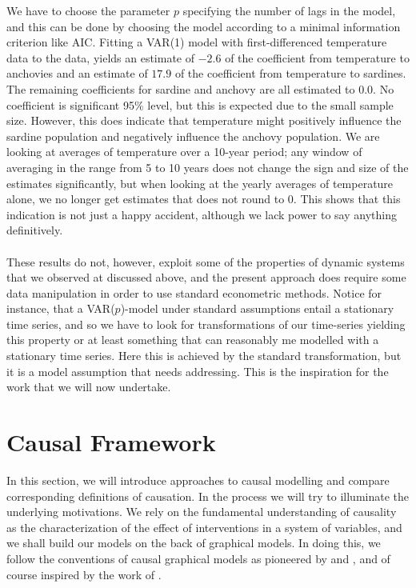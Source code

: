 \documentclass[11pt, a4paper]{memoir}
\theoremstyle{break}
\theoremstyle{break}
\theoremstyle{nonumberplain}
\begin{document}
We have to choose the parameter $p$ specifying the number of lags in the model, and this can be done by choosing the model according to a minimal information criterion like AIC. Fitting a VAR(1) model with first-differenced temperature data to the data, yields an estimate of $-2.6$ of the coefficient from temperature to anchovies and an estimate of $17.9$ of the coefficient from temperature to sardines. The remaining coefficients for sardine and anchovy are all estimated to $0.0$. No coefficient is significant 95\% level, but this is expected due to the small sample size. However, this does indicate that temperature might positively influence the sardine population and negatively influence the anchovy population. We are looking at averages of temperature over a 10-year period; any window of averaging in the range from 5 to 10 years does not change the sign and size of the estimates significantly, but when looking at the yearly averages of temperature alone, we no longer get estimates that does not round to 0. This shows that this indication is not just a happy accident, although we lack power to say anything definitively.\\\\ 
These results do not, however, exploit some of the properties of dynamic systems that we observed at discussed above, and the present approach does require some data manipulation in order to use standard econometric methods. Notice for instance, that a VAR($p$)-model under standard assumptions entail a stationary time series, and so we have to look for transformations of our time-series yielding this property or at least something that can reasonably me modelled with a stationary time series. Here this is achieved by the standard transformation, but it is a model assumption that needs addressing. This is the inspiration for the work that we will now undertake.

\section{Causal Framework}
In this section, we will introduce approaches to causal modelling and compare corresponding definitions of causation. In the process we will try to illuminate the underlying motivations. We rely on the fundamental understanding of causality as the characterization of the effect of interventions in a system of variables, and we shall build our models on the back of graphical models. In doing this, we follow the conventions of causal graphical  models as pioneered by \cite{Spirtes} and \cite{Pearl}, and of course inspired by the work of \cite{Steffen}.
\end{document}
